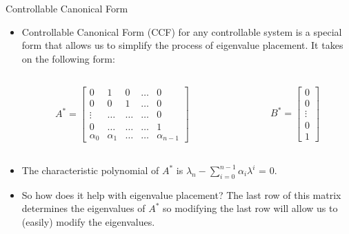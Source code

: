 \documentclass{beamer}
\begin{document}
	\begin{frame}{Controllable Canonical Form}
	    \begin{itemize}
	        \item Controllable Canonical Form (CCF) for any controllable system is a special form that allows us to simplify the process of eigenvalue placement. It takes on the following form:
	        \begin{columns}
	        
	        \begin{column}{0.25\textwidth}
	        \begin{align*}
	        A^* = 
	            \begin{bmatrix}
	                0&1&0 &\hdots &0\\
	                0& 0 & 1& \hdots&0\\
	                \vdots&  \hdots &  \hdots& \hdots&0\\
	                0 & \hdots &\hdots & \hdots &1\\
	                \alpha_{0} & \alpha_{1}& \hdots & \hdots & \alpha_{n-1}
	            \end{bmatrix}
	        \end{align*}
	         \end{column}
	        \begin{column}{0.25\textwidth}
	        \begin{align*}
	        B^* = 
	            \begin{bmatrix}
	               0\\
	               0\\
	               \vdots\\
	               0\\
	               1
	            \end{bmatrix}
	        \end{align*}
	         \end{column}
	        \end{columns}\pause
	       \item The characteristic polynomial of $A^*$ is $\lambda_n - \sum\limits_{i = 0}^{n-1} \alpha_i\lambda^i$ = 0.
	       \item So how does it help with eigenvalue placement? \pause The last row of this matrix determines the eigenvalues of $A^*$ so modifying the last row will allow us to (easily) modify the eigenvalues.  
	    \end{itemize}
	\end{frame}
\end{document}
